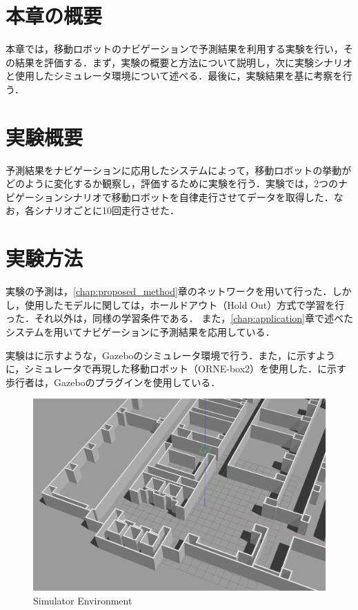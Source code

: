 

\section{本章の概要}
本章では，移動ロボットのナビゲーションで予測結果を利用する実験を行い，その結果を評価する．まず，実験の概要と方法について説明し，次に実験シナリオと使用したシミュレータ環境について述べる．最後に，実験結果を基に考察を行う．

\section{実験概要}
予測結果をナビゲーションに応用したシステムによって，移動ロボットの挙動がどのように変化するか観察し，評価するために実験を行う．実験では，2つのナビゲーションシナリオで移動ロボットを自律走行させてデータを取得した．なお，各シナリオごとに10回走行させた．

\section{実験方法}
実験の予測は，\ref{chap:proposed_method}章のネットワークを用いて行った．しかし，使用したモデルに関しては，ホールドアウト（Hold Out）方式で学習を行った．それ以外は，同様の学習条件である．
また，\ref{chap:application}章で述べたシステムを用いてナビゲーションに予測結果を応用している．

実験はに示すような，Gazebo\cite{Gazebo62:online}のシミュレータ環境で行う．また，に示すように，シミュレータで再現した移動ロボット（ORNE-box2\cite{井口颯人2023屋外自律移動ロボットプラットフォーム-orne}）を使用した．に示す歩行者は，Gazeboのプラグイン\cite{Actors-G87:online}を使用している．

\begin{figure}[H]
  \centering
 \includegraphics[keepaspectratio, scale=0.15]
      {images/sim-env.png}
\caption{Simulator Environment}
 \label{Fig:sim-env}
\end{figure} 

